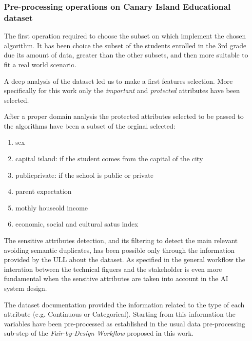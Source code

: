 \subsubsection{Pre-processing operations on Canary Island Educational dataset}

The first operation required to choose the subset on which implement the chosen algorithm. It has been choice the subset of the students enrolled in the 3rd grade due its amount of data, greater than the other subsets, and then more suitable to fit a real world scenario.

A deep analysis of the dataset led us to make a first features selection. More specifically for this work only the \emph{important} and \emph{protected} attributes have been selected.

After a proper domain analysis the protected attributes selected to be passed to the algorithms have been a subset of the orginal selected:

\begin{enumerate}

    \item sex

    \item capital island: if the student comes from the capital of the city

    \item public\textunderscore private: if the school is public or private

    \item parent expectation
    
    \item mothly houseold income

    \item economic, social and cultural satus index

\end{enumerate}

The sensitive attributes detection, and its filtering to detect the main relevant avoiding semantic duplicates, has been possible only through the information provided by the ULL about the dataset. As specified in the general workflow the interation between the technical figuers and the stakeholder is even more fundamental when the sensitive attributes are taken into account in the AI system design.

The dataset documentation provided the information related to the type of each attribute (e.g. Continuous or Categorical). Starting from this information the variables have been pre-processed as established in the usual data pre-processing sub-step of the \emph{Fair-by-Design Workflow} proposed in this work.

